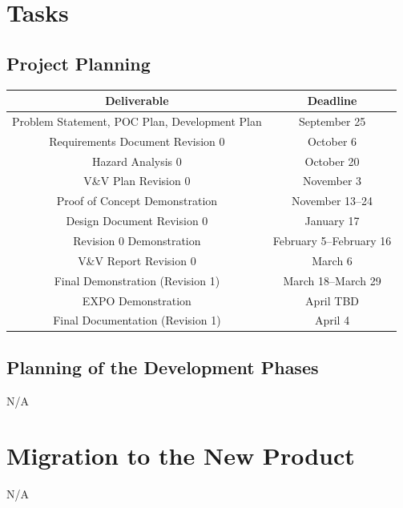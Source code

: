 \documentclass[12pt]{article}
\begin{document}
\section{Tasks}
\subsection{Project Planning}

\begin{center}
\begin{tabular}{ |c|c| } 
\hline
\textbf{Deliverable} & \textbf{Deadline} \\ 
 \hline
 Problem Statement, POC Plan, Development Plan & September 25 \\ 
 Requirements Document Revision 0  & October 6 \\
Hazard Analysis 0 & October 20  \\ 
 V\&V Plan Revision 0 & November 3 \\ 
Proof of Concept Demonstration & November 13--24 \\
Design Document Revision 0 & January 17 \\
Revision 0 Demonstration & February 5--February 16\\
V\&V Report Revision 0 & March 6 \\
Final Demonstration (Revision 1) & March 18--March 29 \\
EXPO Demonstration & April TBD \\
Final Documentation (Revision 1) & April 4 \\
 \hline
\end{tabular}
\end{center}

\subsection{Planning of the Development Phases}
N/A

\section{Migration to the New Product}

N/A

\end{document}
